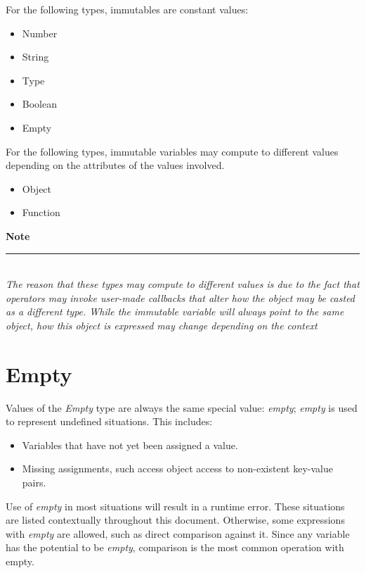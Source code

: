 \documentclass[12pt,letterpaper]{report}
\newcommand{\noteline}{\noindent\textbf{Note}\\\noindent\rule{5cm}{0.4pt}\\}
\begin{document}
For the following types, immutables are constant values:
\begin{itemize}
  \item Number 
  \item String 
  \item Type
  \item Boolean
  \item Empty 
\end{itemize}

For the following types, immutable variables may compute to different values depending on the attributes of the values involved.
\begin{itemize}
  \item Object 
  \item Function  
\end{itemize}



\noteline
\textit{
The reason that these types may compute to different values is due to the fact that operators may invoke user-made callbacks that 
alter how the object may be casted as a different type. While the immutable variable will always point to 
the same object, how this object is expressed may change depending on the context
}






\section{Empty}\label{Empty}

Values of the \textit{Empty} type are always the same special value: \textit{empty};
\textit{empty} is used to represent undefined situations. This includes:

\begin{itemize}
  \item Variables that have not yet been assigned a value.
  \item Missing assignments, such access object access to non-existent key-value pairs.
\end{itemize}

Use of \textit{empty} in most situations will result in a runtime error. These situations 
are listed contextually throughout this document. Otherwise, some expressions with 
\textit{empty} are allowed, such as direct comparison against it. Since any variable 
has the potential to be \textit{empty}, comparison is the most common operation with 
empty.
\end{document}
